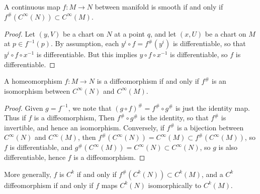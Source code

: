 \begin{lemma}
    A continuous map $f:M \to N$ between manifold is smooth if and only if $f^\#(C^\infty(N)) \subset C^\infty(M)$.
\end{lemma}
\begin{proof}
    Let $(y,V)$ be a chart on $N$ at a point $q$, and let $(x,U)$ be a chart on $M$ at $p \in f^{-1}(p)$. By assumption, each $y^i \circ f = f^\#(y^i)$ is differentiable, so that $y^i \circ f \circ x^{-1}$ is differentiable. But this implies $y \circ f \circ x^{-1}$ is differentiable, so $f$ is differentiable.
\end{proof}

\begin{theorem}
    A homeomorphism $f:M \to N$ is a diffeomorphism if and only if $f^\#$ is an isomorphism between $C^\infty(N)$ and $C^\infty(M)$.
\end{theorem}
\begin{proof}
    Given $g = f^{-1}$, we note that $(g \circ f)^\# = f^\# \circ g^\#$ is just the identity map. Thus if $f$ is a diffeomorphism, Then $f^\# \circ g^\#$ is the identity, so that $f^\#$ is invertible, and hence an isomorphism. Conversely, if $f^\#$ is a bijection between $C^\infty(N)$ and $C^\infty(M)$, then $f^\#(C^\infty(N)) = C^\infty(M) \subset f^\#(C^\infty(M))$, so $f$ is differentiable, and $g^\#(C^\infty(M)) = C^\infty(N) \subset C^\infty(N)$, so $g$ is also differentiable, hence $f$ is a diffeomorphism.
\end{proof}

\begin{remark}
    More generally, $f$ is $C^k$ if and only if $f^\#(C^k(N)) \subset C^k(M)$, and a $C^k$ diffeomorphism if and only if $f$ maps $C^k(N)$ isomorphically to $C^k(M)$.
\end{remark}


